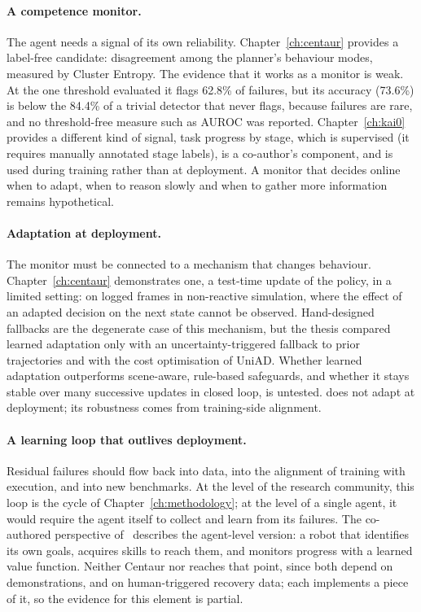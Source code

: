 \paragraph{A competence monitor.} The agent needs a signal of its own reliability. Chapter~\ref{ch:centaur} provides a label-free candidate: disagreement among the planner's behaviour modes, measured by Cluster Entropy. The evidence that it works as a monitor is weak. At the one threshold evaluated it flags 62.8\% of failures, but its accuracy (73.6\%) is below the 84.4\% of a trivial detector that never flags, because failures are rare, and no threshold-free measure such as AUROC was reported. Chapter~\ref{ch:kai0} provides a different kind of signal, task progress by stage, which is supervised (it requires manually annotated stage labels), is a co-author's component, and is used during training rather than at deployment. A monitor that decides online when to adapt, when to reason slowly and when to gather more information remains hypothetical.

\paragraph{Adaptation at deployment.} The monitor must be connected to a mechanism that changes behaviour. Chapter~\ref{ch:centaur} demonstrates one, a test-time update of the policy, in a limited setting: on logged frames in non-reactive simulation, where the effect of an adapted decision on the next state cannot be observed. Hand-designed fallbacks are the degenerate case of this mechanism, but the thesis compared learned adaptation only with an uncertainty-triggered fallback to prior trajectories and with the cost optimisation of UniAD. Whether learned adaptation outperforms scene-aware, rule-based safeguards, and whether it stays stable over many successive updates in closed loop, is untested. \chiz does not adapt at deployment; its robustness comes from training-side alignment.

\paragraph{A learning loop that outlives deployment.} Residual failures should flow back into data, into the alignment of training with execution, and into new benchmarks. At the level of the research community, this loop is the cycle of Chapter~\ref{ch:methodology}; at the level of a single agent, it would require the agent itself to collect and learn from its failures. The co-authored perspective of~\cite{chen2025robot} describes the agent-level version: a robot that identifies its own goals, acquires skills to reach them, and monitors progress with a learned value function. Neither Centaur nor \chiz reaches that point, since both depend on demonstrations, and \chiz on human-triggered recovery data; each implements a piece of it, so the evidence for this element is partial.

